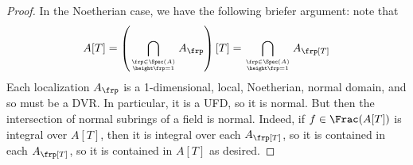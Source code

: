 \begin{proof}
	In the Noetherian case, we have the following briefer argument: note that
	\[ A[T] = \left(\bigcap_{\frp \in \Spec(A) \atop \height\frp = 1} A_\frp\right)[T] = \bigcap_{\frp \in \Spec(A) \atop \height\frp = 1} A_\frp[T] \]
	Each localization $A_\frp$ is a 1-dimensional, local, Noetherian, normal domain, and so must be a DVR. In particular, it is a UFD, so it is normal. But then the intersection of normal subrings of a field is normal. Indeed, if $f \in \Frac(A[T])$ is integral over $A[T]$, then it is integral over each $A_\frp[T]$, so it is contained in each $A_\frp[T]$, so it is contained in $A[T]$ as desired.
\end{proof}
